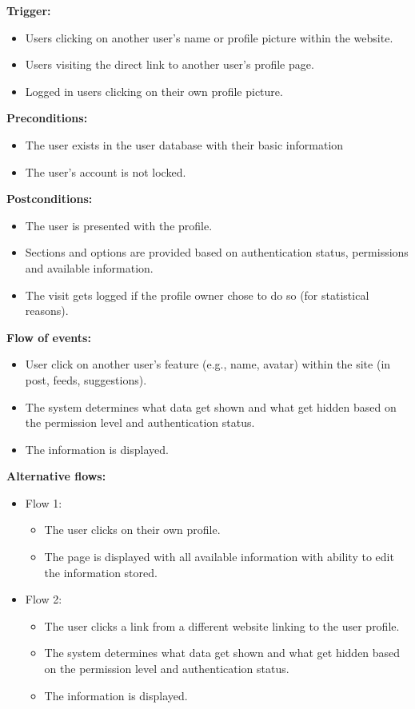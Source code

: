\documentclass[a4paper]{article}
\begin{document}
\textbf{Trigger:}
\begin{itemize}
    \item Users clicking on another user's name or profile picture within the website.
    \item Users visiting the direct link to another user's profile page.
    \item Logged in users clicking on their own profile picture.
\end{itemize}

\textbf{Preconditions:}
\begin{itemize}
    \item The user exists in the user database with their basic information
    \item The user's account is not locked.
\end{itemize}

\textbf{Postconditions:}
\begin{itemize}
    \item The user is presented with the profile.
    \item Sections and options are provided based on authentication status, permissions and available information.
    \item The visit gets logged if the profile owner chose to do so (for statistical reasons).
\end{itemize}

\textbf{Flow of events:}
\begin{itemize}
    \item User click on another user's feature (e.g., name, avatar) within the site (in post, feeds, suggestions).
    \item The system determines what data get shown and what get hidden based on the permission level and authentication status.
    \item The information is displayed.
\end{itemize}

\textbf{Alternative flows:}
\begin{itemize}
    \item Flow 1:
          \begin{itemize}
              \item The user clicks on their own profile.
              \item The page is displayed with all available information with ability to edit the information stored.
          \end{itemize}
    \item Flow 2:
          \begin{itemize}
              \item The user clicks a link from a different website linking to the user profile.
              \item The system determines what data get shown and what get hidden based on the permission level and authentication status.
              \item The information is displayed.
          \end{itemize}
\end{itemize}
\end{document}
